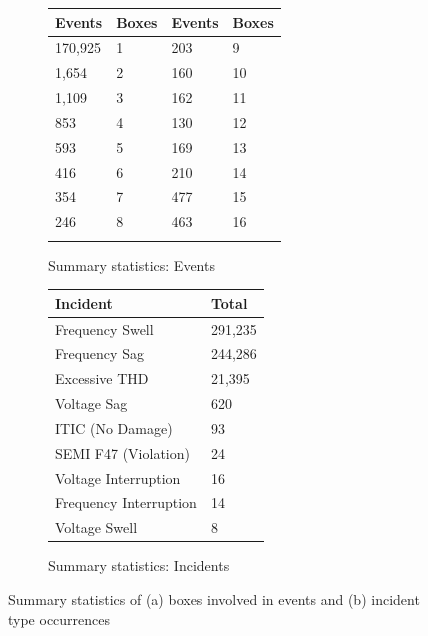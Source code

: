 \begin{figure}[ht]
	\centering
	\begin{subfigure}{.5\textwidth}
        \begin{tabularx}{\textwidth}{XXXX|}
            \toprule
            \textbf{Events} & \textbf{Boxes} & \textbf{Events} & \textbf{Boxes} \\
            \midrule
            170,925 & 1 & 203 & 9 \\
            1,654 & 2 & 160 & 10 \\
            1,109 & 3 & 162 & 11 \\
            853 & 4 & 130 & 12 \\
            593 & 5 & 169 & 13 \\
            416 & 6 & 210 & 14 \\
            354 & 7 & 477 & 15 \\
            246 & 8 & 463 & 16 \\
             &  &  &  \\
            \bottomrule
        \end{tabularx}
	  \caption{Summary statistics: Events}
	\end{subfigure}%
	\begin{subfigure}{.5\textwidth}
	 \begin{tabularx}{\textwidth}{lX}
               \toprule
               \textbf{Incident} & \textbf{Total}  \\
               \midrule
               Frequency Swell & 291,235 \\
               Frequency Sag & 244,286  \\
               Excessive THD & 21,395 \\
               Voltage Sag & 620 \\
               ITIC (No Damage) & 93 \\
               SEMI F47 (Violation) & 24 \\
               Voltage Interruption & 16 \\
               Frequency Interruption & 14 \\
               Voltage Swell & 8 \\
               \bottomrule
           \end{tabularx}
   	  \caption{Summary statistics: Incidents}
	\end{subfigure}
	\caption{Summary statistics of (a) boxes involved in events and (b) incident type occurrences}
	\label{fig:statistics}
\end{figure}

